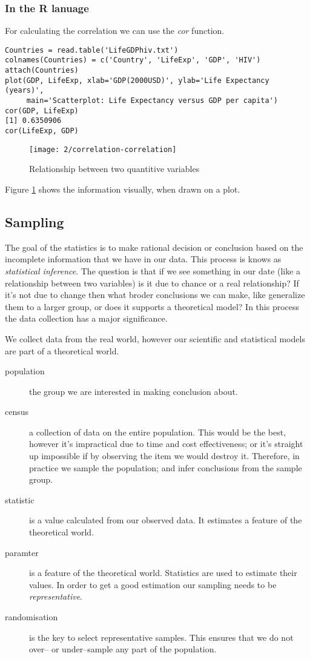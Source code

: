 \subsubsection{In the R lanuage}

For calculating the correlation we can use the \emph{cor} function.
 
\begin{verbatim}
Countries = read.table('LifeGDPhiv.txt')
colnames(Countries) = c('Country', 'LifeExp', 'GDP', 'HIV')
attach(Countries)
plot(GDP, LifeExp, xlab='GDP(2000USD)', ylab='Life Expectancy (years)', 
     main='Scatterplot: Life Expectancy versus GDP per capita')
cor(GDP, LifeExp)
[1] 0.6350906
cor(LifeExp, GDP)
\end{verbatim}

\begin{figure}[htbp]
\label{fig:correlation}
\caption{Relationship between two quantitive variables}
\texttt{[image: 2/correlation-correlation]}
\end{figure}

Figure \ref{fig:correlation} shows the information visually, when drawn on a
plot.

\subsection{Sampling}
The goal of the statistics is to make rational decision or conclusion based on
the incomplete information that we have in our data. This process is knows as
\emph{statistical inference}. The question is that if we see something in our
date (like a relationship between two variables) is it due to chance or a real
relationship? If it's not due to change then what broder conclusions we can
make, like generalize them to a larger group, or does it supports a theoretical
model? In this process the data collection has a major significance.

We collect data from the real world, however our scientific and
statistical models are part of a theoretical world. 

\begin{description}
  \item[population] the group we are interested in making conclusion about.
  \item[census] a collection of data on the entire population. This would be the
  best, however it's impractical due to time and cost effectiveness; or it's
  straight up impossible if by observing the item we would destroy it.
  Therefore, in practice we sample the population; and infer conclusions from
  the sample group.
  \item[statistic] is a value calculated from our observed data. It estimates a
  feature of the theoretical world.
  \item[paramter] is a feature of the theoretical world. Statistics are used to
  estimate their values. In order to get a good estimation our sampling needs
  to be \emph{representative}.
  \item[randomisation] is the key to select representative samples. This ensures
  that we do not over-- or under--sample any part of the population.  
\end{description}

